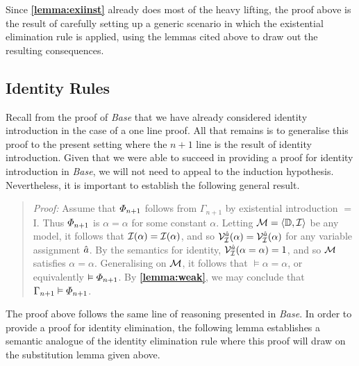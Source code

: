 Since \textbf{\ref{lemma:exiinst}} already does most of the heavy lifting, the proof above is the result of carefully setting up a generic scenario in which the existential elimination rule is applied, using the lemmas cited above to draw out the resulting consequences.



\subsection{Identity Rules}%
  \label{sub:IdentityRules}

Recall from the proof of \textit{Base} that we have already considered identity introduction in the case of a one line proof.
All that remains is to generalise this proof to the present setting where the $n+1$ line is the result of identity introduction. 
Given that we were able to succeed in providing a proof for identity introduction in \textit{Base}, we will not need to appeal to the induction hypothesis.
Nevertheless, it is important to establish the following general result.
  


\begin{quote} 
  \textit{Proof:} Assume that $\varPhi_{n+1}$ follows from $\Gamma_{n+1}$ by existential introduction $=$I.
  Thus $\varPhi_{n+1}$ is $\alpha=\alpha$ for some constant $\alpha$. 
  Letting $\mathcal{M}=\langle\mathbb{D},\mathcal{I}\rangle$ be any model, it follows that $\mathcal{I}(\alpha)=\mathcal{I}(\alpha)$, and so $\mathcal{V}_{\mathcal{I}}^{\hat{a}}(\alpha)=\mathcal{V}_{\mathcal{I}}^{\hat{a}}(\alpha)$ for any variable assignment $\hat{a}$.
  By the semantics for identity, $\mathcal{V}_{\mathcal{I}}^{\hat{a}}(\alpha=\alpha)=1$, and so $\mathcal{M}$ satisfies $\alpha=\alpha$.
  Generalising on $\mathcal{M}$, it follows that $\models \alpha=\alpha$, or equivalently $\vDash \varPhi_{n+1}$.
  By \textbf{\ref{lemma:weak}}, we may conclude that $\Gamma_{n+1}\vDash\varPhi_{n+1}$.
\end{quote}

The proof above follows the same line of reasoning presented in \textit{Base}.
In order to provide a proof for identity elimination, the following lemma establishes a semantic analogue of the identity elimination rule where this proof will draw on the substitution lemma given above.




